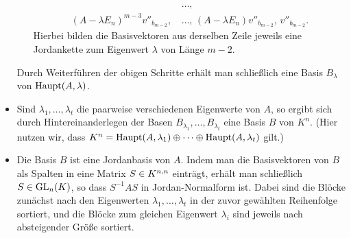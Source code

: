 \documentclass[a4paper,10pt,numbers = noenddot]{scrartcl}
\begin{document}
\begin{itemize}[resume]
\begin{itemize}
\begin{align*}
                                                    &\dotsc,                                                    \\
          (A - \lambda E_n)^{m-3} v''_{b_{m-2}},\,  &\dotsc,\,  (A - \lambda E_n) v''_{b_{m-2}},\,  v''_{b_{m-2}}.
        \end{align*}
        Hierbei bilden die Basisvektoren aus derselben Zeile jeweils eine Jordankette zum Eigenwert $\lambda$ von Länge $m-2$.
    \end{itemize}
    Durch Weiterführen der obigen Schritte erhält man schließlich eine Basis $B_\lambda$ von $\hauptspace{A}{\lambda}$.
    
  \item
    Sind $\lambda_1, \dotsc, \lambda_t$ die paarweise verschiedenen Eigenwerte von $A$, so ergibt sich durch Hintereinanderlegen der Basen $B_{\lambda_1}, \dotsc, B_{\lambda_t}$ eine Basis $B$ von $K^n$.
    (Hier nutzen wir, dass $K^n = \hauptspace{A}{\lambda_1} \oplus \dotsb \oplus \hauptspace{A}{\lambda_t}$ gilt.)
 
  \item
    Die Basis $B$ ist eine Jordanbasis von $A$.
    Indem man die Basisvektoren von $B$ als Spalten in eine Matrix $S \in \matrices{n}{K}$ einträgt, erhält man schließlich $S \in \GL{n}{K}$, so dass $S^{-1} A S$ in Jordan-Normalform ist.
    Dabei sind die Blöcke zunächst nach den Eigenwerten $\lambda_1, \dotsc, \lambda_t$ in der zuvor gewählten Reihenfolge sortiert, und die Blöcke zum gleichen Eigenwert $\lambda_i$ sind jeweils nach absteigender Größe sortiert.
\end{itemize}
\end{document}
